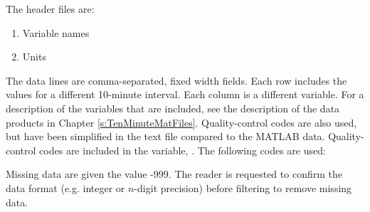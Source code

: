 The header files are:
\begin{enumerate}
\item Variable names
\item Units
\end{enumerate}

The data lines are comma-separated, fixed width fields. Each row includes the values for a different 10-minute interval. Each column is a different variable. For a description of the variables that are included, see the description of the data products in Chapter \ref{s:TenMinuteMatFiles}.  Quality-control codes are also used, but have been simplified in the text file compared to the MATLAB data. Quality-control codes are included in the variable, . The following codes are used:
\begin{itemize}
\end{itemize}

Missing data are given the value -999. The reader is requested to confirm the data format (e.g. integer or $n$-digit precision) before filtering to remove missing data.